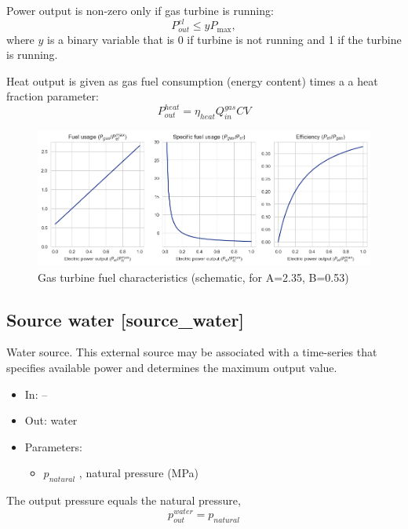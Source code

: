 \documentclass[12pt]{article}
\begin{document}
Power output is non-zero only if gas turbine is running:
\begin{equation}
	 P_{out}^{el} \leq yP_{\max },
\end{equation}
where  $y$ is a binary variable that is 0 if turbine is not running and 1 if the turbine is running.

Heat output is given as gas fuel consumption (energy content) times a a heat fraction parameter:
 \begin{equation}
	P_{out}^{heat}= \eta _{heat}Q_{in}^{gas} CV
\end{equation}

\begin{figure}[]
\centering
		\includegraphics[width=\columnwidth]{./media/gt_fuel_curves.png}
		\caption{Gas turbine fuel characteristics (schematic, for A=2.35, B=0.53)}
		\label{fig:gasturbine_fuel}
\end{figure}



\subsection{Source water [source\_water]}

Water source. 
This external source may be associated with a time-series that specifies available power and determines the maximum output value.

\begin{itemize}
\item In: --
\item Out: water
\item Parameters: 
\begin{itemize}[noitemsep,topsep=0pt]
	\item $p_{natural}$ , natural pressure (MPa)
\end{itemize}
\end{itemize}

\medskip\noindent
The output pressure equals the natural pressure,
\begin{equation}
	p^{water}_{out} = p_{natural}
\end{equation}
\end{document}
